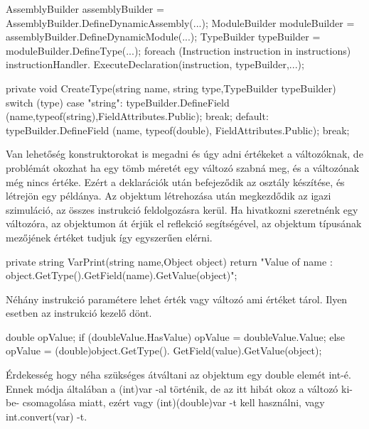 \begin{cpp}
AssemblyBuilder assemblyBuilder = 
AssemblyBuilder.DefineDynamicAssembly(...);
ModuleBuilder moduleBuilder = 
assemblyBuilder.DefineDynamicModule(...);
TypeBuilder typeBuilder = moduleBuilder.DefineType(...);
foreach (Instruction instruction in instructions)
{
        instructionHandler.
        ExecuteDeclaration(instruction, typeBuilder,...);
}


private void CreateType(string name, string type,TypeBuilder typeBuilder)
        {
            switch (type)
            {
                case "string":
                    typeBuilder.DefineField
                    (name,typeof(string),FieldAttributes.Public);
                    break;
                default:
                    typeBuilder.DefineField
                    (name, typeof(double), FieldAttributes.Public);
                    break;
            }
        }
\end{cpp}

Van lehetőség konstruktorokat is megadni és úgy adni értékeket a változóknak, de problémát okozhat ha egy tömb méretét egy változó szabná meg, és a változónak még nincs értéke. Ezért a deklarációk után befejeződik az osztály készítése, és létrejön egy példánya.
Az objektum létrehozása után megkezdődik az igazi szimuláció, az összes instrukció feldolgozásra kerül. Ha hivatkozni szeretnénk egy változóra, az objektumon át érjük el reflekció segítségével, az objektum típusának mezőjének értéket tudjuk így egyszerűen elérni.

\begin{cpp}
private string VarPrint(string name,Object object)
        {
            return "Value of {name} : 
            {object.GetType().GetField(name).GetValue(object)}";
        }
\end{cpp}

Néhány instrukció paramétere lehet érték vagy változó ami értéket tárol. Ilyen esetben az instrukció kezelő dönt.

\begin{cpp}
			double opValue;
            if (doubleValue.HasValue)
            {
                opValue = doubleValue.Value;
            }
            else
            {
                opValue = (double)object.GetType().
                GetField(value).GetValue(object);
            }
\end{cpp}

Érdekesség hogy néha szükséges átváltani az objektum egy double elemét int-é. Ennek módja általában a (int)var -al történik, de az itt hibát okoz a változó ki-be- csomagolása miatt, ezért vagy (int)(double)var -t kell használni, vagy int.convert(var) -t.

